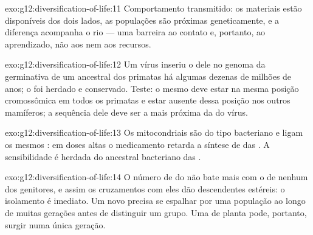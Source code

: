 \begin{solution}{exo:g12:diversification-of-life:11}
Comportamento transmitido: os materiais estão disponíveis dos dois
lados, as populações são próximas geneticamente, e a diferença
acompanha o rio --- uma barreira ao contato e, portanto, ao
aprendizado, não aos  nem aos recursos.
\end{solution}

\begin{solution}{exo:g12:diversification-of-life:12}
Um vírus inseriu o  dele no genoma da  germinativa de um
ancestral dos primatas há algumas dezenas de milhões de anos; o 
foi herdado e conservado. Teste: o mesmo  deve estar na mesma
posição cromossômica em todos os primatas e estar ausente dessa posição
nos outros mamíferos; a sequência dele deve ser a mais próxima da do vírus.
\end{solution}

\begin{solution}{exo:g12:diversification-of-life:13}
Os  mitocondriais são do tipo bacteriano e ligam os mesmos
: em doses altas o medicamento retarda a síntese de
 das . A sensibilidade é herdada do ancestral
bacteriano das .
\end{solution}

\begin{solution}{exo:g12:diversification-of-life:14}
O número de  do  não bate mais com o de nenhum dos
genitores, e assim os cruzamentos com eles dão descendentes estéreis: o
isolamento é imediato. Um  novo precisa se espalhar por uma
população ao longo de muitas gerações antes de distinguir um grupo. Uma
 de planta pode, portanto, surgir numa única geração.
\end{solution}

